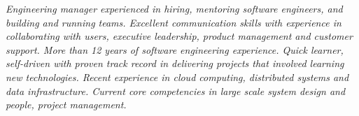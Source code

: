 {\selectfont
\textit{Engineering manager experienced in hiring, mentoring software engineers, and building and running teams. Excellent communication skills with experience in collaborating with users, executive leadership, product management and customer support. More than 12 years of software engineering experience. Quick learner, self-driven with proven track record in delivering projects that involved learning new technologies. Recent experience in cloud computing, distributed systems and data infrastructure. Current core competencies in large scale system design and people, project management.}
}